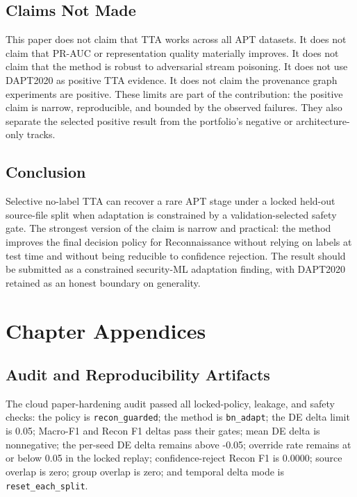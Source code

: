 \documentclass[10pt]{article}
\begin{document}
\section{Claims Not Made}

This paper does not claim that TTA works across all APT datasets.
It does not claim that PR-AUC or representation quality materially improves.
It does not claim that the method is robust to adversarial stream poisoning.
It does not use DAPT2020 as positive TTA evidence.
It does not claim the provenance graph experiments are positive.
These limits are part of the contribution: the positive claim is narrow, reproducible, and bounded by the observed failures.
They also separate the selected positive result from the portfolio's negative or architecture-only tracks.

\section{Conclusion}

Selective no-label TTA can recover a rare APT stage under a locked held-out source-file split when adaptation is constrained by a validation-selected safety gate.
The strongest version of the claim is narrow and practical: the method improves the final decision policy for Reconnaissance without relying on labels at test time and without being reducible to confidence rejection.
The result should be submitted as a constrained security-ML adaptation finding, with DAPT2020 retained as an honest boundary on generality.

\FloatBarrier

\ifdefined\praxiswrapper
\chapter*{Chapter Appendices}
\else
\appendix
\fi

\section{Audit and Reproducibility Artifacts}

The cloud paper-hardening audit passed all locked-policy, leakage, and safety checks:
the policy is \texttt{recon\_guarded}; the method is \texttt{bn\_adapt}; the DE delta limit is 0.05; Macro-F1 and Recon F1 deltas pass their gates; mean DE delta is nonnegative; the per-seed DE delta remains above -0.05; override rate remains at or below 0.05 in the locked replay; confidence-reject Recon F1 is 0.0000; source overlap is zero; group overlap is zero; and temporal delta mode is \texttt{reset\_each\_split}.
\end{document}

